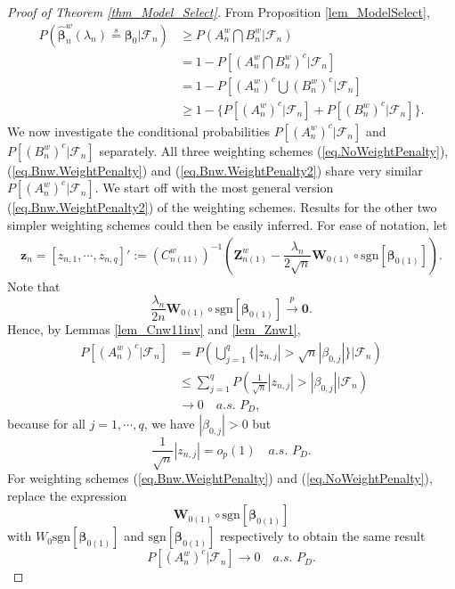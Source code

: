 \documentclass[ejs,authoryear,linksfromyear]{imsart}
\newcommand{\bnw}{\widehat{\bm{\beta}}_n^w} %
\newcommand{\cnwa}{C_{n(11)}^w}
\newcommand{\znwa}{\bm{Z}_{n(1)}^w}
\numberwithin{equation}{section}
\theoremstyle{plain}
\begin{document}
\begin{proof}[Proof of Theorem \ref{thm_Model_Select}]
	From Proposition \ref{lem_ModelSelect}, 
	\begin{align*}
	P\left(
	\bnw (\lambda_n) \stackrel{s}{=} \bm{\beta}_0
	\big\vert \mathcal{F}_n
	\right)	
	&\geq P \left( 
	A_n^w \bigcap B_n^w 
	\big\vert \mathcal{F}_n
	\right) \\
	&= 1- P \left[
	\left( 
	A_n^w \bigcap B_n^w 
	\right)^c
	\bigg\vert \mathcal{F}_n
	\right] \\
	&= 1- P \left[
	\left( A_n^w \right)^c 
	\bigcup 
	\left( B_n^w  \right)^c
	\big\vert \mathcal{F}_n
	\right] \\
	&\geq 1 - \Big\{
	P \left[ 
	\left( A_n^w \right)^c
	\big\vert \mathcal{F}_n 
	\right]
	+ P \left[ 
	\left( B_n^w \right)^c
	\big\vert \mathcal{F}_n
	\right]
	\Big\}.
	\end{align*}
	We now investigate the conditional probabilities $P \left[ \left( A_n^w \right)^c \big\vert \mathcal{F}_n \right]$ and $P \left[ \left( B_n^w \right)^c \big\vert \mathcal{F}_n \right]$ separately. All three weighting schemes (\ref{eq.NoWeightPenalty}), (\ref{eq.Bnw.WeightPenalty}) and (\ref{eq.Bnw.WeightPenalty2}) share very similar $P \left[ \left( A_n^w \right)^c \big\vert \mathcal{F}_n \right]$. We start off with the most general version (\ref{eq.Bnw.WeightPenalty2}) of the weighting schemes. Results for the other two simpler weighting schemes could then be easily inferred. For ease of notation, let
	\begin{align*}
	\bm{z}_n = [z_{n,1}, \cdots, z_{n,q}]' := \left( \cnwa \right)^{-1} 
	\left(
	\znwa - 
	\dfrac{\lambda_n}{2 \sqrt{n}}
	\bm{W}_{0(1)} \circ
	\text{sgn} \left[ \bm{\beta}_{0(1)} \right]
	\right).
	\end{align*}
	Note that
	$$
	\dfrac{\lambda_n}{2n}
	\bm{W}_{0(1)} \circ
	\text{sgn} \left[ \bm{\beta}_{0(1)} \right]
	\stackrel{p}{\longrightarrow} \bm{0}.
	$$
	Hence, by Lemmas \ref{lem_Cnw11inv} and \ref{lem_Znw1},
	\begin{align*}
	P \left[
	\left( A_n^w \right)^c
	| \mathcal{F}_n
	\right] 
	&= P \left(
		\bigcup_{j=1}^q
		\Big\{
			\left\vert z_{n,j} \right\vert
			> \sqrt{n} \left\vert \beta_{0,j} \right\vert
		\Big\}
		\bigg\vert \mathcal{F}_n 
	\right) \\
	&\leq \sum_{j=1}^q P 
	\left(
		\frac{1}{\sqrt{n}}
		\left\vert z_{n,j} \right\vert
		> \left\vert \beta_{0,j} \right\vert
		\bigg\vert \mathcal{F}_n 
	\right) \\
	&\to 0 \quad a.s. \,\, P_D,
	\end{align*}
	because for all $j = 1, \cdots, q$, we have $\left\vert \beta_{0,j} \right\vert > 0$ but
	$$
	\frac{1}{\sqrt{n}}
	\left\vert z_{n,j} \right\vert = o_p(1)
	\quad a.s. \,\, P_D.
	$$ 
	For weighting schemes (\ref{eq.Bnw.WeightPenalty}) and (\ref{eq.NoWeightPenalty}), replace the expression
	$$
	\bm{W}_{0(1)} \circ \text{sgn} \left[\bm{\beta}_{0(1)} \right] 
	$$
	with $W_0 \text{sgn} \left[ \bm{\beta}_{0(1)} \right]$ and $\text{sgn} \left[ \bm{\beta}_{0(1)} \right]$ respectively to obtain the same result 
	$$
	P \left[ \left( A_n^w \right)^c | \mathcal{F}_n \right] 
	\to 0 \quad a.s. \,\, P_D.
	$$ 
	

\end{proof}
\end{document}
